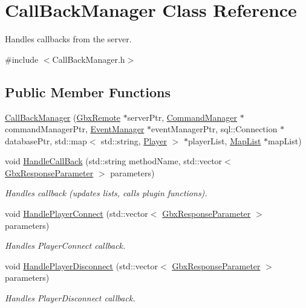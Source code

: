 \hypertarget{classCallBackManager}{\section{Call\-Back\-Manager Class Reference}
\label{classCallBackManager}
}


Handles callbacks from the server.  




{\ttfamily \#include $<$Call\-Back\-Manager.\-h$>$}

\subsection*{Public Member Functions}
\begin{DoxyCompactItemize}
\item 
\hyperlink{classCallBackManager_aecf87c2156353eb95b8ca85bebde8b71}{Call\-Back\-Manager} (\hyperlink{classGbxRemote}{Gbx\-Remote} $\ast$server\-Ptr, \hyperlink{classCommandManager}{Command\-Manager} $\ast$command\-Manager\-Ptr, \hyperlink{classEventManager}{Event\-Manager} $\ast$event\-Manager\-Ptr, sql\-::\-Connection $\ast$database\-Ptr, std\-::map$<$ std\-::string, \hyperlink{structPlayer}{Player} $>$ $\ast$player\-List, \hyperlink{classMapList}{Map\-List} $\ast$map\-List)
\item 
void \hyperlink{classCallBackManager_a8af5305f668aae4c563e7039b99015c2}{Handle\-Call\-Back} (std\-::string method\-Name, std\-::vector$<$ \hyperlink{classGbxResponseParameter}{Gbx\-Response\-Parameter} $>$ parameters)
\begin{DoxyCompactList}\small\item\em Handles callback (updates lists, calls plugin functions). \end{DoxyCompactList}\item 
void \hyperlink{classCallBackManager_a48e888c80841cf757ebdd69726a8aed5}{Handle\-Player\-Connect} (std\-::vector$<$ \hyperlink{classGbxResponseParameter}{Gbx\-Response\-Parameter} $>$ parameters)
\begin{DoxyCompactList}\small\item\em Handles Player\-Connect callback. \end{DoxyCompactList}\item 
void \hyperlink{classCallBackManager_aa762cbece4e59d8395f5dbd857c53f17}{Handle\-Player\-Disconnect} (std\-::vector$<$ \hyperlink{classGbxResponseParameter}{Gbx\-Response\-Parameter} $>$ parameters)
\begin{DoxyCompactList}\small\item\em Handles Player\-Disconnect callback. \end{DoxyCompactList}\item 

\end{DoxyCompactItemize}
